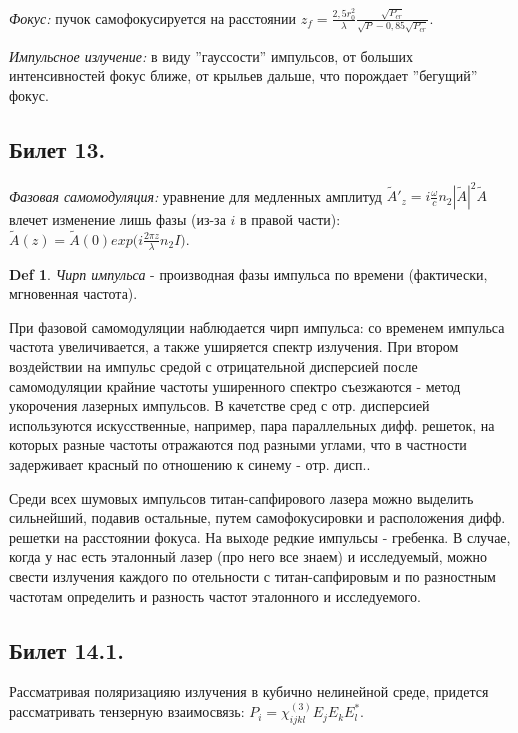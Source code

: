 \documentclass[a4paper,12pt]{article}
\theoremstyle{definition} %
\theoremstyle{definition} %
\newtheorem{Def}{Def}[section]
\theoremstyle{remark} %
\begin{document}
	\textit{Фокус:} пучок самофокусируется на расстоянии $z_{f}=\frac{2,5 r_{0}^{2}}{\lambda} \frac{\sqrt{P_{cr}}}{\sqrt{P}-0,85\sqrt{P_{cr}}}$.


	\textit{Импульсное излучение:} в виду ''гауссости'' импульсов, от больших интенсивностей фокус ближе, от крыльев дальше, что порождает ''бегущий'' фокус.


\subsection{Билет 13.}


	\textit{Фазовая самомодуляция:} уравнение для медленных амплитуд $\tilde{A}'_{z}=i\frac{\omega}{c} n_{2} |\tilde{A}|^{2}\tilde{A}$ влечет изменение лишь фазы (из-за $i$ в правой части): $\tilde{A}(z)=\tilde{A}(0)exp \big(i\frac{2\pi z}{\lambda} n_{2}I \big)$.

\begin{Def}
	\textit{Чирп импульса} - производная фазы импульса по времени (фактически, мгновенная частота).
\end{Def}

	При фазовой самомодуляции наблюдается чирп импульса: со временем импульса частота увеличивается, а также уширяется спектр излучения. При втором воздействии на импульс средой с отрицательной дисперсией после самомодуляции крайние частоты уширенного спектро съезжаются - метод укорочения лазерных импульсов. В качетстве сред с отр. дисперсией используются искусственные, например, пара параллельных дифф. решеток, на которых разные частоты отражаются под разными углами, что в частности задерживает красный по отношению к синему - отр. дисп..


	Среди всех шумовых импульсов титан-сапфирового лазера можно выделить сильнейший, подавив остальные, путем самофокусировки и расположения дифф. решетки на расстоянии фокуса. На выходе редкие импульсы - гребенка. В случае, когда у нас есть эталонный лазер (про него все знаем) и исследуемый, можно свести излучения каждого по отельности с титан-сапфировым и по разностным частотам определить и разность частот эталонного и исследуемого.


\subsection{Билет 14.1.}


	Рассматривая поляризацияю излучения в кубично нелинейной среде, придется рассматривать тензерную взаимосвязь: $P_{i}=\chi^{(3)}_{ijkl}E_{j}E_{k}E_{l}^{*}$.
\end{document}
